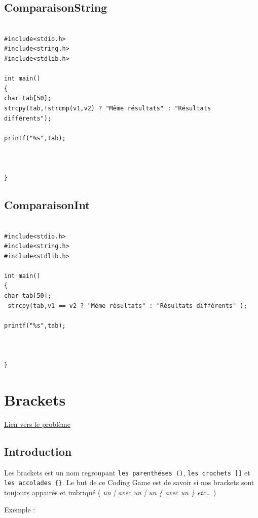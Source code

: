 \documentclass[11pt]{article}
\begin{document}
\subsection{ComparaisonString}
\label{sec:org958c49b}

\begin{verbatim}

#include<stdio.h>
#include<string.h>
#include<stdlib.h>

int main()
{
char tab[50];
strcpy(tab,!strcmp(v1,v2) ? "Même résultats" : "Résultats différents");

printf("%s",tab);



}
\end{verbatim}


\subsection{ComparaisonInt}
\label{sec:org5718277}

\begin{verbatim}

#include<stdio.h>
#include<string.h>
#include<stdlib.h>

int main()
{
char tab[50];
 strcpy(tab,v1 == v2 ? "Même résultats" : "Résultats différents" );

printf("%s",tab);



}
\end{verbatim}




\section{Brackets}
\label{sec:org9787ad5}

\href{https://www.codingame.com/training/easy/brackets-extreme-edition}{Lien vers le problème}

\subsection{Introduction}
\label{sec:orgfc5d397}

Les brackets est un nom regroupant \texttt{les parenthéses ()}, \texttt{les
crochets []} et \texttt{les accolades \{\}}. Le but de ce Coding Game est de
savoir si nos brackets sont toujours appairés et imbriqué ( \emph{un [ avec un ] un \{
avec un \}  etc\ldots{}} ) 

Exemple :
\end{document}
